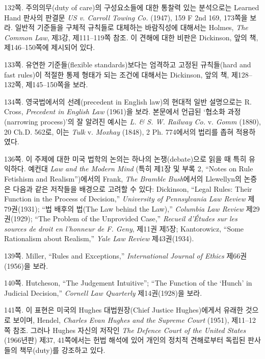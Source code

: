 {\noteentry 132쪽.  주의의무(duty of care)의
구성요소들에 대한 통찰력 있는 분석으로는 Learned Hand 판사의 판결문
\emph{US v. Carroll Towing Co.} (1947), 159 F 2nd 169, 173쪽을 보라.
일반적 기준들을 구체적 규칙들로 대체하는 바람직성에 대해서는 Holmes,
\emph{The Common Law}, 제3강, 제111--119쪽 참조. 이 견해에 대한 비판은
Dickinson, 앞의 책, 제146--150쪽에 제시되어 있다.

\noteentry 133쪽.  유연한 기준들(flexible standards)보다는 엄격하고 고정된 규칙들(hard and
fast rules)이 적절한 통제 형태가 되는 조건에 대해서는 Dickinson, 앞의
책, 제128--132쪽, 제145--150쪽을 보라.

\noteentry 134쪽.  영국법에서의 선례(precedent in English law)의
현대적 일반 설명으로는 R. Cross, \emph{Precedent in English Law}
(1961)을 보라. 본문에서 언급된 ‘협소화 과정(narrowing process)’의 잘
알려진 예시는 \emph{L. \& S. W. Railway Co.} v. \emph{Gomm} (1880), 20
Ch.D. 562로, 이는 \emph{Tulk} v. \emph{Moxhay} (1848), 2 Ph. 774에서의
법리를 좁혀 적용하였다.

\noteentry 136쪽.  이
주제에 대한 미국 법학의 논의는 하나의 논쟁(debate)으로 읽을 때 특히
유익하다. 예컨대 \emph{Law and the Modern Mind} (특히 제1장 및 부록 2,
“Notes on Rule Fetishism and Realism”)에서의 Frank, \emph{The Bramble
Bush}에서의 Llewellyn의 논증은 다음과 같은 저작들을 배경으로 고려할 수
있다: Dickinson, “Legal Rules: Their Function in the Process of
Decision,” \emph{University of Pennsylvania Law Review} 제79권(1931);
“법 배후의 법(The Law behind the Law),” \emph{Columbia Law Review}
제29권(1929); “The Problem of the Unprovided Case,” \emph{Recueil
d'Études sur les sources de droit en l'honneur de F. Geny}, 제11권
제5장; Kantorowicz, “Some Rationalism about Realism,” \emph{Yale Law
Review} 제43권(1934).

\noteentry 139쪽.  Miller, “Rules and Exceptions,”
\emph{International Journal of Ethics} 제66권(1956)을 보라.

\noteentry 140쪽.  Hutcheson, “The Judgement Intuitive”; “The Function of the `Hunch' in
Judicial Decision,” \emph{Cornell Law Quarterly} 제14권(1928)을 보라.

\noteentry 141쪽.  이 표현은 미국의 Hughes 대법원장(Chief
Justice Hughes)에게서 유래한 것으로 보이며, Hendel, \emph{Charles Evan
Hughes and the Supreme Court} (1951), 제11--12쪽 참조. 그러나 Hughes
자신의 저작인 \emph{The Defence Court of the United States} (1966년판)
제37, 41쪽에서는 헌법 해석에 있어 개인의 정치적 견해로부터 독립된
판사들의 책무(duty)를 강조하고 있다.

}
